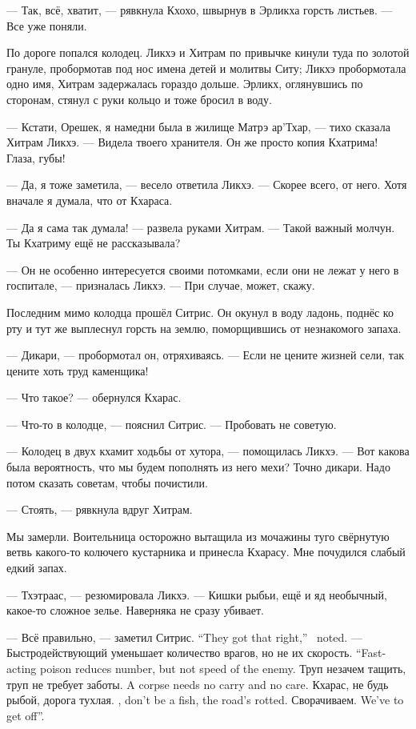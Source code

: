 --- Так, всё, хватит, --- рявкнула Кхохо, швырнув в Эрликха горсть листьев.
--- Все уже поняли.

По дороге попался колодец.
Ликхэ и Хитрам по привычке кинули туда по золотой грануле, пробормотав под нос имена детей и молитвы Ситу;
Ликхэ пробормотала одно имя, Хитрам задержалась гораздо дольше.
Эрликх, оглянувшись по сторонам, стянул с руки кольцо и тоже бросил в воду.

--- Кстати, Орешек, я намедни была в жилище Матрэ ар'Тхар, --- тихо сказала Хитрам Ликхэ.
--- Видела твоего хранителя.
Он же просто копия Кхатрима!
Глаза, губы!

--- Да, я тоже заметила, --- весело ответила Ликхэ.
--- Скорее всего, от него.
Хотя вначале я думала, что от Кхараса.

--- Да я сама так думала! --- развела руками Хитрам.
--- Такой важный молчун.
Ты Кхатриму ещё не рассказывала?

--- Он не особенно интересуется своими потомками, если они не лежат у него в госпитале, --- призналась Ликхэ.
--- При случае, может, скажу.

Последним мимо колодца прошёл Ситрис.
Он окунул в воду ладонь, поднёс ко рту и тут же выплеснул горсть на землю, поморщившись от незнакомого запаха.

--- Дикари, --- пробормотал он, отряхиваясь.
--- Если не цените жизней сели, так цените хоть труд каменщика!

--- Что такое? --- обернулся Кхарас.

--- Что-то в колодце, --- пояснил Ситрис.
--- Пробовать не советую.

--- Колодец в двух кхамит ходьбы от хутора, --- помощилась Ликхэ.
--- Вот какова была вероятность, что мы будем пополнять из него мехи?
Точно дикари.
Надо потом сказать советам, чтобы почистили.

--- Стоять, --- рявкнула вдруг Хитрам.

Мы замерли.
Воительница осторожно вытащила из мочажины туго свёрнутую ветвь какого-то колючего кустарника и принесла Кхарасу.
Мне почудился слабый едкий запах.

--- Тхэтраас, --- резюмировала Ликхэ.
--- Кишки рыбьи, ещё и яд необычный, какое-то сложное зелье.
Наверняка не сразу убивает.

{--- Всё правильно, --- заметил Ситрис.}
{``They got that right,'' \Sitris\ noted.}
{--- Быстродействующий уменьшает количество врагов, но не их скорость.}
{``Fast-acting poison reduces number, but not speed of the enemy.}
{Труп незачем тащить, труп не требует заботы.}
{A corpse needs no carry and no care.}
{Кхарас, не будь рыбой, дорога тухлая.}
{\Kcharas, don't be a fish, the road's rotted.}
{Сворачиваем.}
{We've to get off''.}

